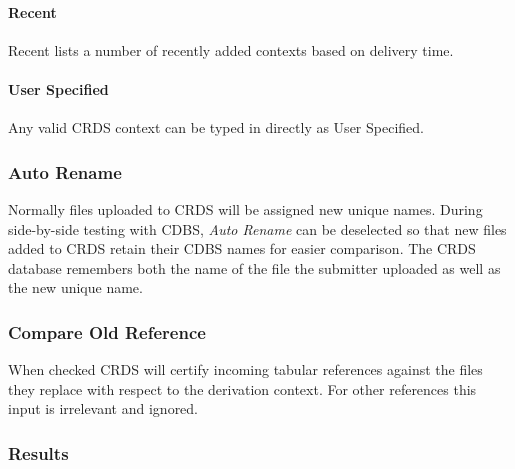 \documentclass[letterpaper,10pt,english]{sphinxmanual}
\begin{document}
\paragraph{Recent}
\label{web_site_use:recent}
Recent lists a number of recently added contexts based on delivery time.


\paragraph{User Specified}
\label{web_site_use:user-specified}
Any valid CRDS context can be typed in directly as User Specified.


\subsubsection{Auto Rename}
\label{web_site_use:auto-rename}
Normally files uploaded to CRDS will be assigned new unique names.   During side-by-side
testing with CDBS,  \emph{Auto Rename} can be deselected so that new files added to CRDS
retain their CDBS names for easier comparison.  The CRDS database remembers both
the name of the file the submitter uploaded as well as the new unique name.


\subsubsection{Compare Old Reference}
\label{web_site_use:compare-old-reference}
When checked CRDS will certify incoming tabular references against the files
they replace with respect to the derivation context.   For other references this
input is irrelevant and ignored.


\subsubsection{Results}
\label{web_site_use:results}\begin{figure}[htbp]
\centering

\end{figure}
\end{document}
